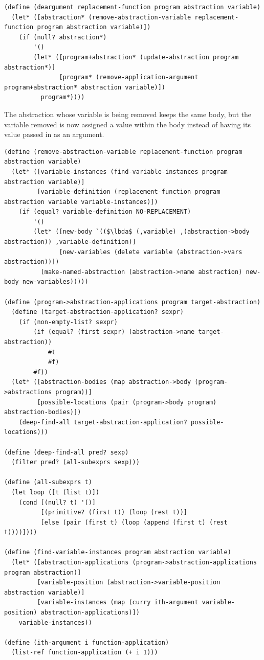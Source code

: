 \documentclass[a4paper,10pt]{article}
\newcommand{\lbda}{\color[rgb]{0,.3,.7} \lambda}
\begin{document}
\begin{lstlisting}[frame=trbl]
(define (deargument replacement-function program abstraction variable)
  (let* ([abstraction* (remove-abstraction-variable replacement-function program abstraction variable)])
    (if (null? abstraction*)
        '()
        (let* ([program+abstraction* (update-abstraction program abstraction*)]
               [program* (remove-application-argument program+abstraction* abstraction variable)])
          program*))))
\end{lstlisting}
The abstraction whose variable is being removed keeps the same body, but the variable removed is now assigned a value within the body instead of having its value passed in as an argument.
\begin{lstlisting}[frame=trbl]
(define (remove-abstraction-variable replacement-function program abstraction variable)
  (let* ([variable-instances (find-variable-instances program abstraction variable)]
         [variable-definition (replacement-function program abstraction variable variable-instances)])
    (if (equal? variable-definition NO-REPLACEMENT)
        '()
        (let* ([new-body `(($\lbda$ (,variable) ,(abstraction->body abstraction)) ,variable-definition)]
               [new-variables (delete variable (abstraction->vars abstraction))])
          (make-named-abstraction (abstraction->name abstraction) new-body new-variables)))))

(define (program->abstraction-applications program target-abstraction)
  (define (target-abstraction-application? sexpr)
    (if (non-empty-list? sexpr)
        (if (equal? (first sexpr) (abstraction->name target-abstraction))
            #t
            #f)
        #f))
  (let* ([abstraction-bodies (map abstraction->body (program->abstractions program))]
         [possible-locations (pair (program->body program) abstraction-bodies)])
    (deep-find-all target-abstraction-application? possible-locations)))

(define (deep-find-all pred? sexp)
  (filter pred? (all-subexprs sexp)))

(define (all-subexprs t)
  (let loop ([t (list t)])
    (cond [(null? t) '()]
          [(primitive? (first t)) (loop (rest t))]
          [else (pair (first t) (loop (append (first t) (rest t))))])))

(define (find-variable-instances program abstraction variable)
  (let* ([abstraction-applications (program->abstraction-applications program abstraction)]
         [variable-position (abstraction->variable-position abstraction variable)]
         [variable-instances (map (curry ith-argument variable-position) abstraction-applications)])
    variable-instances))

(define (ith-argument i function-application)
  (list-ref function-application (+ i 1)))
\end{lstlisting}
\end{document}
